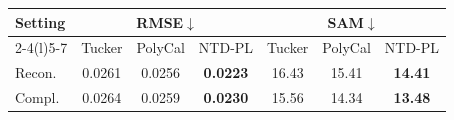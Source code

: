\begin{tabular}{@{}l ccc ccc@{}}
\toprule
Setting & \multicolumn{3}{c}{RMSE$\downarrow$} & \multicolumn{3}{c}{SAM$\downarrow$} \\
\cmidrule(lr){2-4}\cmidrule(l){5-7}
 & Tucker & PolyCal & NTD-PL & Tucker & PolyCal & NTD-PL \\
\midrule
Recon. & 0.0261 & 0.0256 & \textbf{0.0223} & 16.43 & 15.41 & \textbf{14.41} \\
Compl. & 0.0264 & 0.0259 & \textbf{0.0230} & 15.56 & 14.34 & \textbf{13.48} \\
\bottomrule
\end{tabular}
